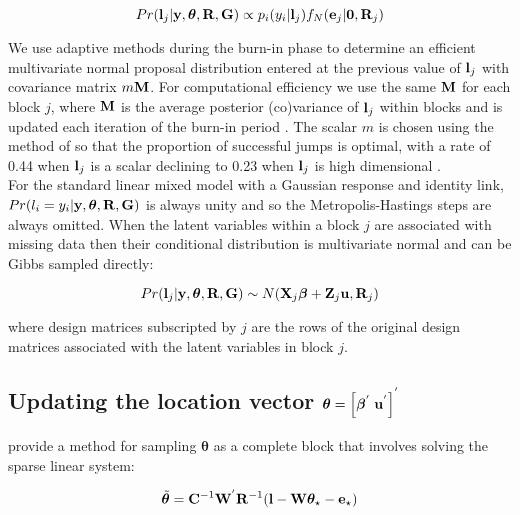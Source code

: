 \documentclass{article}
\begin{document}
\begin{equation}
Pr({\bf l}_{j}|{\bf y}, {\bm \theta}, {\bf R}, {\bf G}) \propto    {p}_{i}({y}_{i} | {\bf l}_{j})f_{N}({\bf e}_{j}|{\bf 0}, {\bf R}_{j})
\label{pcl3-Eq}
\end{equation}

We use adaptive methods during the burn-in phase to determine an efficient multivariate normal proposal distribution entered at the previous value of ${\bf l}_{j}$ with covariance matrix $m{\bf M}$. For computational efficiency we use the same ${\bf M}$ for each block $j$, where ${\bf M}$ is the average posterior (co)variance of ${\bf l}_{j}$ within blocks and is updated each iteration of the burn-in period  \citet{Haario.2001}. The scalar $m$ is chosen using the method of \citet{Ovaskainen.2008} so that the proportion of successful jumps is optimal, with a rate of 0.44 when ${\bf l}_{j}$ is a scalar declining to 0.23 when ${\bf l}_{j}$ is high dimensional \citep{Gelman.2004}.\\

For the standard linear mixed model with a Gaussian response and identity link, $Pr({l}_{i}={y}_{i}|{\bf y}, {\bm \theta}, {\bf R}, {\bf G})$ is always unity and so the Metropolis-Hastings steps are always omitted.  When the latent variables within a block $j$ are associated with missing data then their conditional distribution is multivariate normal and can be  Gibbs sampled directly:

\begin{equation}
Pr({\bf l}_{j}|{\bf y}, {\bm \theta}, {\bf R}, {\bf G}) \sim  N({\bf X}_{j}{\bm \beta}+{\bf Z}_{j}{\bf u}, {\bf R}_{j})
\label{pcl4-Eq}
\end{equation}

where design matrices subscripted by $j$ are the rows of the original design matrices associated with the latent variables in block $j$.   
  
\subsection[Updating the location vector]{Updating the location vector ${\bm \theta} =  \left[{\bm \beta}^{'}\; {\bf u}^{'}\right]^{'}$}

\citet{Garcia-Cortes.2001} provide a method for sampling ${\bm \theta}$ as a complete block that involves solving the sparse linear system:

\begin{equation}
\tilde{\bm \theta} = {\bf C}^{-1}{\bf W}^{'}{\bf R}^{-1}({\bf l} - {\bf W}{\bm \theta}_{\star}-{\bf e}_{\star})
\label{sMME-Eq}
\end{equation}
\end{document}

